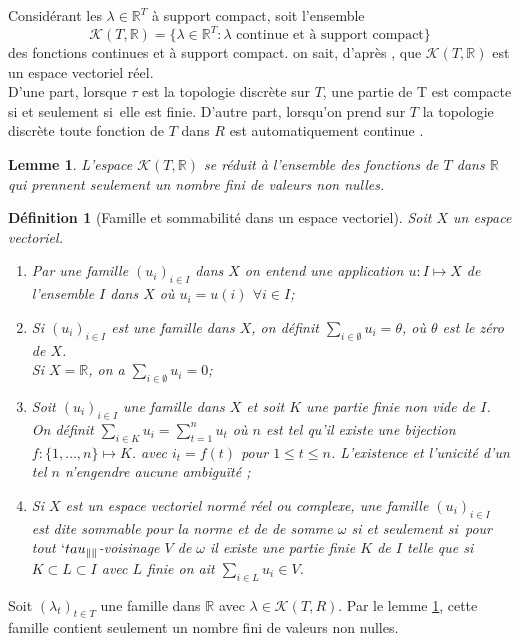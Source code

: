 \documentclass[11pt]{report}
\newenvironment{boxtheorem}
{\begin{tcolorbox}
		[enhanced jigsaw,breakable,pad at break*=2mm,
		colback=black!5,colframe=bleueLeger]}
	{\end{tcolorbox}}
\newenvironment{boxdefinition}
{\begin{tcolorbox}
		[enhanced jigsaw,breakable,pad at break*=1mm,
		colback=black!5!white,boxrule=0pt,frame hidden,
		borderline west={1.5mm}{-2mm}{blue}]}
	{\end{tcolorbox}}
\theoremstyle{styletheorem}
\newtheorem{lemma}[theoreme]{Lemme}
\theoremstyle{styledef}
\newtheorem{definitions}[theoreme]{Définition}
\theoremstyle{remark}
\newenvironment{lemme}
{\vspace*{0.3cm}\begin{boxtheorem}\begin{lemma}}{\end{lemma}\end{boxtheorem}\vspace*{0.3cm}}
\newenvironment{definition}{\vspace*{0.3cm}\begin{boxdefinition}\begin{definitions}}{\end{definitions}\end{boxdefinition}\vspace*{0.3cm}}
\newcommand{\ssi}{si et seulement si\  }
\newcommand{\R}{\ensuremath{\mathbb{R}}}
\begin{document}
Considérant les $\lambda \in \R^T$ à support compact, soit l'ensemble  $$\mathcal{K}(T,\R)= \lbrace \lambda \in \R^T \colon \lambda \text{ continue et à support compact}\rbrace$$ des fonctions continues et à support compact. on sait, d'après  \cite{b11}, que $\mathcal{K}(T,\R)$ est un espace vectoriel réel.\\
D'une part, lorsque  $\tau$ est la topologie discrète sur $T$, une partie de T est compacte \ssi elle est finie. D'autre part, lorsqu'on prend sur $T$ la topologie discrète toute fonction de $T$ dans $R$ est automatiquement continue \cite{b9, b11}.
\begin{lemme}\label{KTR}
	L'espace $\mathcal{K}(T,\R)$ se réduit à l'ensemble des fonctions de $T$ dans $\R$ qui prennent seulement un nombre fini de valeurs non nulles.
\end{lemme}
\begin{definition}[Famille et sommabilité dans un espace vectoriel]
	Soit $X$ un espace vectoriel. 
	\begin{enumerate}[label = $\bullet$]
		\item Par une famille $(u_i)_{i \in I}$ dans $X$ on entend une application $u \colon I \mapsto X$ de l'ensemble $I$ dans $X$ où $u_i =u(i)$ $\forall i \in I$;
		\item  Si $(u_i)_{i \in I}$ est une famille dans $X$, on définit $\sum_{i \in \emptyset} u_i =\theta$, où $\theta$ est le zéro de $X$.\\
		Si $X=\R$, on a $\sum_{i \in \emptyset} u_i =0$;
		\item Soit $ (u_i)_{i \in I}$ une famille dans $X$ et soit $K$ une partie finie non vide de $I$. On définit $\sum_{i \in K} u_i = \sum_{t=1}^n u_t$ où $n$ est tel qu'il existe une bijection $f \colon \lbrace 1, \dots, n\rbrace\mapsto K$. avec $i_t = f(t)$ pour $1\leq t\leq n$. L'existence et l'unicité d'un tel $n$ n'engendre aucune ambiguïté \cite{b11};
		\item Si $X$ est un espace vectoriel normé réel ou complexe, une famille $(u_i)_{i \in I}$ est dite sommable pour la norme et de de somme $\omega$ \ssi pour tout $`tau_{\lVert \rVert}$-voisinage $V$ de $\omega$ il existe une partie finie $K$ de $I$ telle que si $K\subset L\subset I$ avec $L$ finie on ait $\sum_{i\in L} u_i \in V$. 
	\end{enumerate}
\end{definition}
Soit $(\lambda_t)_{t\in T}$ une famille dans $\R$ avec $\lambda \in \mathcal{K}(T,R)$. Par le lemme \ref{KTR}, cette famille contient seulement un nombre fini de valeurs non nulles.\\
\end{document}
